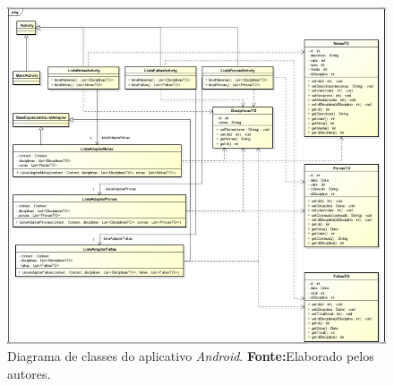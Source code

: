 		\pagebreak
		\begin{figure}[h!]
			\centerline{\includegraphics[scale=0.4]{./imagens/2_q_metodologico/qm7(1).png}}
			\caption[Diagrama de classes do aplicativo \textit{Android}]{Diagrama de
			classes do aplicativo \textit{Android}.
			 \textbf{Fonte:}Elaborado pelos autores.}
			\label{fig:qm7(1)}
		\end{figure}